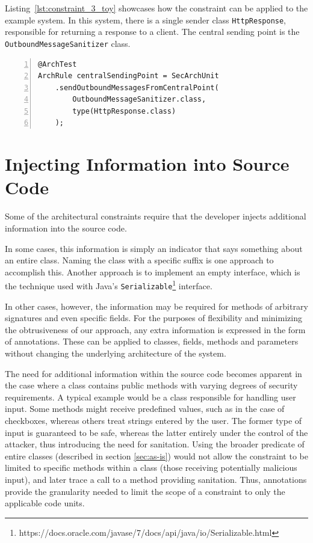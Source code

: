 Listing~\ref{lst:constraint_3_toy} showcases how the constraint can be applied to the example system. In this system, there is a single sender class \texttt{HttpResponse}, responsible for returning a response to a client. The central sending point is the \texttt{OutboundMessageSanitizer} class. 

\begin{minipage}{\linewidth}
\begin{lstlisting}[caption={Application of constraint 3 to the example system.}, captionpos=b, label=lst:constraint_3_toy, numbers=left]
@ArchTest
ArchRule centralSendingPoint = SecArchUnit
    .sendOutboundMessagesFromCentralPoint(
        OutboundMessageSanitizer.class,
        type(HttpResponse.class)
    );
\end{lstlisting}
\end{minipage}




\section{Injecting Information into Source Code}

Some of the architectural constraints require that the developer injects additional information into the source code.

In some cases, this information is simply an indicator that says something about an entire class. Naming the class with a specific suffix is one approach to accomplish this. Another approach is to implement an empty interface, which is the technique used with Java's \texttt{Serializable}\footnote{https://docs.oracle.com/javase/7/docs/api/java/io/Serializable.html} interface. 

In other cases, however, the information may be required for methods of arbitrary signatures and even specific fields. For the purposes of flexibility and minimizing the obtrusiveness of our approach, any extra information is expressed in the form of annotations. These can be applied to classes, fields, methods and parameters without changing the underlying architecture of the system.

The need for additional information within the source code becomes apparent in the case where a class contains public methods with varying degrees of security requirements. A typical example would be a class responsible for handling user input. Some methods might receive predefined values, such as in the case of checkboxes, whereas others treat strings entered by the user.  The former type of input is guaranteed to be safe, whereas the latter entirely under the control of the attacker, thus introducing the need for sanitation. Using the broader predicate of entire classes (described in section \ref{sec:as-is}) would not allow the constraint to be limited to specific methods within a class (those receiving potentially malicious input), and later trace a call to a method providing sanitation. Thus, annotations provide the granularity needed to limit the scope of a constraint to only the applicable code units.

